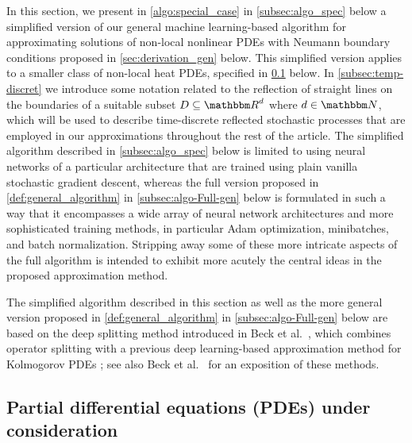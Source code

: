 In this section, we present in \cref{algo:special_case} in \cref{subsec:algo_spec} below a simplified version of our general machine learning-based algorithm for approximating solutions of non-local nonlinear PDEs with Neumann boundary conditions proposed in \cref{sec:derivation_gen} below. This simplified version applies to a smaller class of non-local heat PDEs, specified in \cref{subsec:pde_spec} below. In \cref{subsec:temp-discret} we introduce some notation related to the reflection of straight lines on the boundaries of a suitable subset $D\subseteq\R^d$ where $d\in\N$, which will be used to describe time-discrete reflected stochastic processes that are employed in our approximations throughout the rest of the article. The simplified algorithm described in \cref{subsec:algo_spec} below is limited to using neural networks of a particular architecture that are trained using plain vanilla stochastic gradient descent, whereas the full version proposed in \cref{def:general_algorithm} in \cref{subsec:algo-Full-gen} below is formulated in such a way that it encompasses a wide array of neural network architectures and more sophisticated training methods, in particular Adam optimization, minibatches, and batch normalization. Stripping away some of these more intricate aspects of the full algorithm is intended to exhibit more acutely the central ideas in the proposed approximation method.

The simplified algorithm described in this section as well as the more general version proposed in \cref{def:general_algorithm} in \cref{subsec:algo-Full-gen} below are based on the deep splitting method introduced in Beck et al.~\citep{Beck2019}, which combines operator splitting with a previous deep learning-based approximation method for Kolmogorov PDEs \citep{beck2018solving}; see also Beck et al.~\citep[Sections~2 and~3]{Beck2020} for an exposition of these methods.

\subsection{Partial differential equations (PDEs) under consideration}
\label{subsec:pde_spec}

